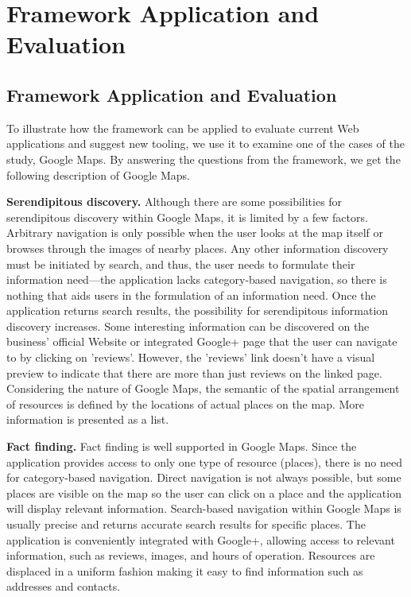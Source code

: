 \chapter{Framework Application and Evaluation}
\label{chapter:application}

{\section{Framework Application and Evaluation}
To illustrate how the framework can be applied to evaluate current Web applications and suggest new tooling, we use it to examine one of the cases of the study, Google Maps. By answering the questions from the framework, we get the following description of Google Maps.

\textbf{Serendipitous discovery.} Although there are some possibilities for serendipitous discovery within Google Maps, it is limited by a few factors. Arbitrary navigation is only possible when the user looks at the map itself or browses through the images of nearby places. Any other information discovery must be initiated by search, and thus, the user needs to formulate their information need---the application lacks category-based navigation, so there is nothing that aids users in the formulation of an information need. Once the application returns search results, the possibility for serendipitous information discovery increases. Some interesting information can be discovered on the business' official Website or integrated Google+ page that the user can navigate to by clicking on 'reviews'. However, the 'reviews' link doesn't have a visual preview to indicate that there are more than just reviews on the linked page. Considering the nature of Google Maps, the semantic of the spatial arrangement of resources is defined by the locations of actual places on the map. More information is presented as a list. 

\textbf{Fact finding.} Fact finding is well supported in Google Maps. Since the application provides access to only one type of resource (places), there is no need for category-based navigation. Direct navigation is not always possible, but some places are visible on the map so the user can click on a place and the application will display relevant information. Search-based navigation within Google Maps is usually precise and returns accurate search results for specific places. The application is conveniently integrated with Google+, allowing access to relevant information, such as reviews, images, and hours of operation. Resources are displaced in a uniform fashion making it easy to find information such as addresses and contacts. 

}
